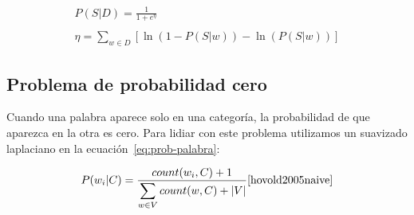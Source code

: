 \begin{gather}
	P(S|D) = \frac{1}{1 + e^\eta}\\\nonumber
	\\
	\eta = \sum_{w \in D}{\left[\ln\left(1 - P(S|w)\right) - \ln(P(S|w))\right]}
\end{gather}

\subsection{Problema de probabilidad cero}

Cuando una palabra aparece solo en una categoría, la probabilidad de que
aparezca en la otra es cero. Para lidiar con este problema utilizamos un
suavizado laplaciano en la ecuación~\ref{eq:prob-palabra}:

\begin{equation}
	\label{eq:prob-palabra-laplace}
	P(w_i|C) = \frac{count(w_i, C) + 1}{\displaystyle\sum_{w \in V}{count(w, C)} + |V|} \cite{hovold2005naive}
\end{equation}
